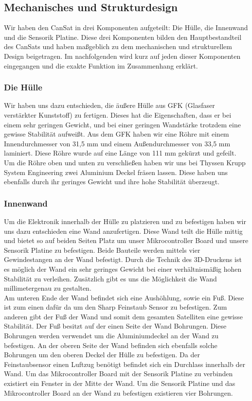 \subsection{Mechanisches und Strukturdesign}

Wir haben den CanSat in drei Komponenten aufgeteilt: Die Hülle, die Innenwand und die Sensorik Platine. Diese drei Komponenten bilden den Hauptbestandteil des CanSats und haben maßgeblich zu dem mechanischen und strukturellem Design beigetragen. Im nachfolgenden wird kurz auf jeden dieser Komponenten eingegangen und die exakte Funktion im Zusammenhang erklärt.

\subsubsection{Die Hülle}
Wir haben uns dazu entschieden, die äußere Hülle aus GFK (Glasfaser verstärkter Kunststoff) zu fertigen. Dieses hat die Eigenschaften, dass er bei einem sehr geringen Gewicht, und bei einer geringen Wandstärke trotzdem eine gewisse Stabilität aufweißt. Aus dem GFK haben wir eine Röhre mit einem Innendurchmesser von 31,5 mm und einem Außendurchmesser von 33,5 mm laminiert. Diese Röhre wurde auf eine Länge von 111 mm gekürzt und gefeilt. Um die Röhre oben und unten zu verschließen haben wir uns bei Thyssen Krupp System Engineering zwei Aluminium Deckel fräsen lassen. Diese haben uns ebenfalls durch ihr geringes Gewicht und ihre hohe Stabilität überzeugt.

\subsubsection{Innenwand}
Um die Elektronik innerhalb der Hülle zu platzieren und zu befestigen haben wir uns dazu entschieden eine Wand anzufertigen. Diese Wand teilt die Hülle mittig und bietet so auf beiden Seiten Platz um unser Mikrocontroller Board und unsere Sensorik Platine zu befestigen. Beide Bauteile werden mittels vier Gewindestangen an der Wand befestigt. Durch die Technik des 3D-Druckens ist es möglich der Wand ein sehr geringes Gewicht bei einer verhältnismäßig hohen Stabilität zu verleihen. Zusätzlich gibt es uns die Möglichkeit die Wand millimetergenau zu gestalten. \\
Am unteren Ende der Wand befindet sich eine Aushöhlung, sowie ein Fuß. Diese ist zum einen dafür da um den Sharp Feinstaub Sensor zu befestigen. Zum anderen gibt der Fuß der Wand und somit dem gesamten Satelliten eine gewisse Stabilität. Der Fuß besitzt auf der einen Seite der Wand Bohrungen. Diese Bohrungen werden verwendet um die Aluminiumdeckel an der Wand zu befestigen. An der oberen Seite der Wand befinden sich ebenfalls solche Bohrungen um den oberen Deckel der Hülle zu befestigen. Da der Feinstaubsensor einen Luftzug benötigt befindet sich ein Durchlass innerhalb der Wand. Um das Mikrocontroller Board mit der Sensorik Platine zu verbinden existiert ein Fenster in der Mitte der Wand. Um die Sensorik Platine und das Mikrocontroller Board an der Wand zu befestigen existieren vier Bohrungen.

